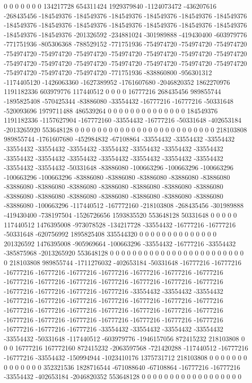 0 0 0 0 0 0 0 134217728 654311424 1929379840 -1124073472 -436207616 -268435456 -184549376 -184549376 -184549376 -184549376 -184549376 -184549376 -184549376 -184549376 -184549376 -184549376 -184549376 -184549376 -184549376 -184549376 -184549376 -201326592 -234881024 -301989888 -419430400 -603979776 -771751936 -805306368 -788529152 -771751936 -754974720 -754974720 -754974720 -754974720 -754974720 -754974720 -754974720 -754974720 -754974720 -754974720 -754974720 -754974720 -754974720 -754974720 -754974720 -754974720 -754974720 -754974720 -754974720 -754974720 -771751936 -838860800 -956301312 -1174405120 -1426063360 -1627389952 -1761607680 -2046820352 1862270976 1191182336 603979776 117440512 0 0 0 0 16777216 268435456 989855744 -1895825408 -570425344 -83886080 -33554432 -16777216 -16777216 -50331648 -520093696 1979711488 486539264 0 0 0 0 0 0 0 0 0 0 0 0 0 0 184549376 1191182336 -1157627904 -167772160 -33554432 -16777216 -50331648 -402653184 -2013265920 553648128 0 0 0 0 0 0 0 0 0 0 0 0 0 0 0 0 0 0
0 0 0 0 0 0 0 218103808 989855744 -1761607680 -452984832 -67108864 -33554432 -33554432 -33554432 -33554432 -33554432 -33554432 -33554432 -33554432 -33554432 -33554432 -33554432 -33554432 -33554432 -33554432 -33554432 -33554432 -33554432 -33554432 -33554432 -50331648 -83886080 -100663296 -100663296 -100663296 -100663296 -100663296 -83886080 -83886080 -83886080 -83886080 -83886080 -83886080 -83886080 -83886080 -83886080 -83886080 -83886080 -83886080 -83886080 -83886080 -83886080 -83886080 -83886080 -83886080 -83886080 -83886080 -100663296 -117440512 -167772160 -218103808 -268435456 -301989888 -419430400 -738197504 -1526726656 1593835520 553648128 50331648 0 0 0 0 0 117440512 1476395008 -973078528 -134217728 -33554432 -16777216 -16777216 -50331648 -620756992 1895825408 335544320 0 0 0 0 0 0 0 0 0 0 0 0 0 0 201326592 1476395008 -905969664 -100663296 -33554432 -16777216 -33554432 -385875968 -2013265920 553648128 0 0 0 0 0 0 0 0 0 0 0 0 0 0 0 0 0 0
0 0 0 0 0 0 0 218103808 989855744 -1711276032 -402653184 -50331648 -16777216 -16777216 -16777216 -16777216 -16777216 -16777216 -16777216 -16777216 -16777216 -16777216 -16777216 -16777216 -16777216 -16777216 -16777216 -16777216 -16777216 -16777216 -16777216 -16777216 -33554432 -33554432 -33554432 -16777216 -16777216 -16777216 -16777216 -16777216 -16777216 -16777216 -16777216 -16777216 -16777216 -16777216 -16777216 -16777216 -16777216 -16777216 -16777216 -16777216 -16777216 -16777216 -16777216 -16777216 -16777216 -16777216 -16777216 -33554432 -33554432 -33554432 -33554432 -33554432 -50331648 -117440512 -603979776 -1946157056 872415232 218103808 0 0 0 16777216 167772160 872415232 -2063597568 -721420288 -117440512 -16777216 -16777216 -33554432 -150994944 -1023410176 1375731712 218103808 0 0 0 0 0 0 0 0 0 0 0 0 0 0 352321536 1828716544 -671088640 -67108864 -16777216 -16777216 -33554432 -402653184 -2046820352 553648128 0 0 0 0 0 0 0 0 0 0 0 0 0 0 0 0 0 0
